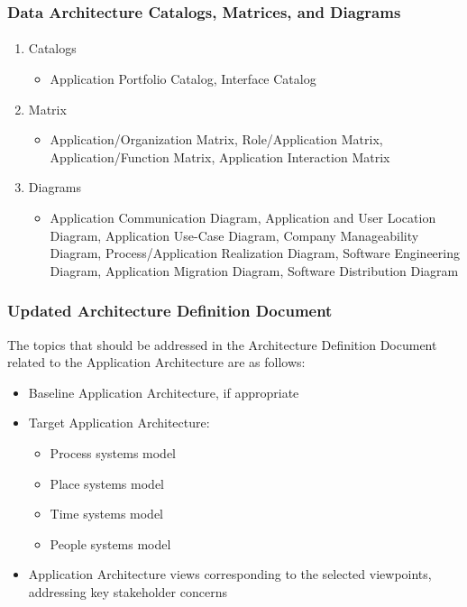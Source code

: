 \documentclass[aspectratio=169, table]{beamer}
\begin{document}
    \begin{frame}
        \frametitle{Data Architecture Catalogs, Matrices, and Diagrams}
        \framesubtitle{\hspace{1cm}}
        \begin{enumerate}
            \item Catalogs
            \begin{itemize}
                \item Application Portfolio Catalog, Interface Catalog
            \end{itemize}
            \item Matrix
            \begin{itemize}
                \item Application/Organization Matrix, Role/Application Matrix, Application/Function Matrix, Application Interaction Matrix
            \end{itemize}
            \item Diagrams
            \begin{itemize}
                \item Application Communication Diagram, Application and User Location Diagram, Application Use-Case Diagram, Company Manageability Diagram, Process/Application Realization Diagram, Software Engineering Diagram, Application Migration Diagram, Software Distribution Diagram
            \end{itemize}
        \end{enumerate}
    \end{frame}

\begin{frame}
	\frametitle{Updated Architecture Definition Document}
	The topics that should be addressed in the Architecture Definition Document related to the Application Architecture are as follows:
	\begin{itemize}
		\item Baseline Application Architecture, if appropriate
		\item Target Application Architecture:
		\begin{itemize}
			\item Process systems model
			\item Place systems model
			\item Time systems model
			\item People systems model
		\end{itemize}
		\item Application Architecture views corresponding to the selected viewpoints, addressing key stakeholder concerns
	\end{itemize}
\end{frame}
\end{document}
